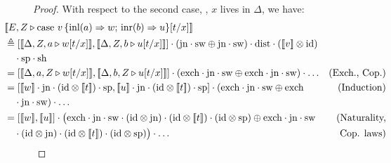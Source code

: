 \begin{proof}
  With respect to the second case, \ie, $x$ lives in $\Delta$, we have: 
  \begin{align*}
  &\hspace{-30pt} [\![E, Z \vljud \text{case } v \,  \{\text{inl} (a) \Rightarrow w ;\, \text{inr} (b) \Rightarrow u\} [t/x]]\!] \\
  & \hspace{-30pt} \triangleq \left[[\![ \Delta  , Z ,  a \vljud w[t/x] ]\!] ,[\![ \Delta, Z, b \vljud u[t/x]  ]\!] \right] \comp (\text{jn}\comp \sw \oplus \text{jn} \comp \sw) \comp \dist  \comp ([\![ v ]\!]   \otimes \id)     \\
  &  \hspace{-20pt} \comp \text{sp} \comp \text{sh}  \\
  & \hspace{-30pt} =  \left[[\![ \Delta  ,   a, Z \vljud w[t/x] ]\!] ,[\![ \Delta, b, Z \vljud u[t/x]  ]\!] \right] \comp ( \text{exch} \comp \text{jn}\comp \sw \oplus  \text{exch} \comp \text{jn} \comp \sw)   \comp \ldots   & {(\text{Exch., Cop.})} \\
  & \hspace{-30pt} =   \left[[\![w ]\!] \comp  \text{jn} \comp (\id \otimes [\![t]\!] ) \comp \text{sp}  ,[\![ u]\!] \comp \text{jn} \comp (\id \otimes [\![t]\!] ) \comp \text{sp} \right] \comp (\text{exch} \comp \text{jn} \comp \sw  \oplus \text{exch}  & {\text{(Induction)}}  \\
  & \hspace{-20pt} \comp\text{jn} \comp \sw ) \comp \ldots \\
  & \hspace{-30pt} =  \left[[\![w ]\!] ,[\![ u]\!] \right] \comp \big(\text{exch} \comp \text{jn} \comp \sw \comp (\id \otimes  \text{jn} ) \comp (\id \otimes [\![t]\!]) \comp  (\id \otimes \text{sp} ) \oplus \text{exch} \comp \text{jn} \comp \sw   & {(\text{Naturality,}} \\
  & \hspace{-30pt} \hspace{10pt} \comp (\id \otimes  \text{jn} ) \comp (\id \otimes [\![t]\!]) \comp  (\id \otimes \text{sp} ) \big)\comp  \ldots & {\text{Cop. laws})} \\

\end{align*}
\end{proof}
